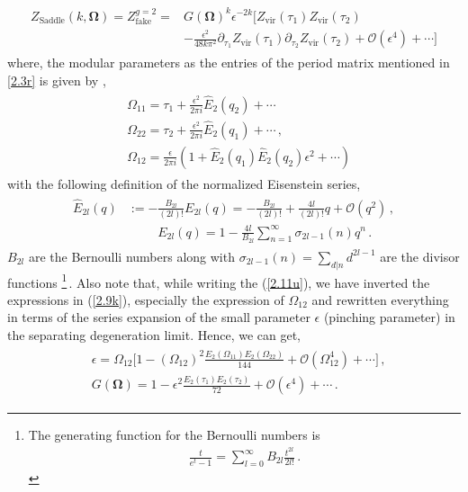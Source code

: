 \documentclass[12 pt]{article}
\begin{document}
\begin{align}
    \begin{split}
 Z_{\text{Saddle}}(k, \mathbf{\Omega})=Z^{g=2}_{\text{fake}}=&G(\mathbf\Omega)^k\epsilon^{-2k}\Bigg[Z_{\textrm{vir}}(\tau_1)Z_{\textrm{vir}}(\tau_2)\\&-\frac{\epsilon^2}{48k\pi^2 }\partial_{\tau_1}Z_{\textrm{vir}}(\tau_1)\partial_{\tau_2}Z_{\textrm{vir}}(\tau_2)+\mathcal{O}(\epsilon^4)+\cdots\Bigg]\label{2.11u}
    \end{split}
\end{align}
\noindent
where, the modular parameters as the entries of the period matrix mentioned in \eqref{2.3r} is given by \cite{Tuite:1999id},
\begin{align}
\begin{split}
   & \Omega_{11}=\tau_1+\frac{\epsilon^2}{2\pi i }\hat E_2(q_2)+\cdots\\&
   \Omega_{22}=\tau_2+\frac{\epsilon^2}{2\pi i }\hat E_2(q_1)+\cdots\,,
   \\&
    \Omega_{12}=\frac{\epsilon}{2\pi i }(1+\hat{E}_2(q_1)\hat{E}_2(q_2)\epsilon^2+\cdots)\label{2.9k}
    \end{split}
\end{align}
with the following definition of the normalized Eisenstein series,
\begin{align}
\begin{split}
\hat{E}_{2l}(q) &:= -\frac{B_{2l}}{(2l)!} E_{2l}(q) = -\frac{B_{2l}}{(2l)!} + \frac{4l}{(2l)!} q + \mathcal{O}(q^2)\,, \\&\hspace{1cm}
E_{2l}(q) = 1 - \frac{4l}{B_{2l}} \sum_{n=1}^{\infty} \sigma_{2l-1}(n) q^n\,.
\label{eq:E2-def}\end{split}
\end{align}
$B_{2l}$ are the Bernoulli numbers along with $\sigma_{2l-1}(n)=\sum_{d|n}d^{2l-1}$ are the divisor functions \footnote{The generating function for the Bernoulli numbers is
\begin{align}
    \frac{t}{e^t-1}=\sum_{l=0}^\infty B_{2l}\frac{t^{2l}}{2l!}\,.
\end{align}}\,.
Also note that, while writing the (\ref{2.11u}), we have inverted the expressions in (\ref{2.9k}), especially the expression of $\Omega_{12}$ and rewritten everything in terms of the series expansion of the small parameter $\epsilon$ (pinching parameter) in the separating degeneration limit. Hence, we can get,
\begin{align}
    \begin{split}
        &\epsilon= \Omega_{12}\Big[1-( \Omega_{12})^2\frac{E_{2}(\Omega_{11})E_2(\Omega_{22})}{144}+\mathcal{O}( \Omega_{12}^4)+\cdots\Big]\,,\\&
       G(\mathbf\Omega)=1-\epsilon^2\frac{E_{2}(\tau_1)E_2(\tau_2)}{72}+\mathcal{O}(\epsilon^4)+\cdots\,.
    \end{split}
\end{align}
\end{document}
